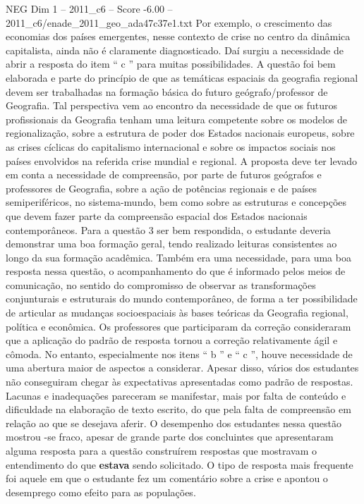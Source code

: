 \begin{textsample}{NEG Dim 1 – 2011\_c6 – Score -6.00 – 2011\_c6/enade\_2011\_geo\_ada47c37e1.txt}
Por exemplo, o crescimento das economias dos países emergentes, nesse contexto de crise no centro da dinâmica capitalista, ainda não é claramente diagnosticado.
Daí surgiu a necessidade de abrir a resposta do item “ c ” para muitas possibilidades.
A questão foi bem elaborada e parte do princípio de que as temáticas espaciais da geografia regional devem ser trabalhadas na formação básica do futuro geógrafo/professor de Geografia.
Tal perspectiva vem ao encontro da necessidade de que os futuros profissionais da Geografia tenham uma leitura competente sobre os modelos de regionalização, sobre a estrutura de poder dos Estados nacionais europeus, sobre as crises cíclicas do capitalismo internacional e sobre os impactos sociais nos países envolvidos na referida crise mundial e regional.
A proposta deve ter levado em conta a necessidade de compreensão, por parte de futuros geógrafos e professores de Geografia, sobre a ação de potências regionais e de países semiperiféricos, no sistema-mundo, bem como sobre as estruturas e concepções que devem fazer parte da compreensão espacial dos Estados nacionais contemporâneos.
Para a questão 3 ser bem respondida, o estudante deveria demonstrar uma boa formação geral, tendo realizado leituras consistentes ao longo da sua formação acadêmica.
Também era uma necessidade, para uma boa resposta nessa questão, o acompanhamento do que é informado pelos meios de comunicação, no sentido do compromisso de observar as transformações conjunturais e estruturais do mundo contemporâneo, de forma a ter possibilidade de articular as mudanças socioespaciais às bases teóricas da Geografia regional, política e econômica.
Os professores que participaram da correção consideraram que a aplicação do padrão de resposta tornou a correção relativamente ágil e cômoda.
No entanto, especialmente nos itens “ b ” e “ c ”, houve necessidade de uma abertura maior de aspectos a considerar.
Apesar disso, vários dos estudantes não conseguiram chegar às expectativas apresentadas como padrão de respostas.
Lacunas e inadequações pareceram se manifestar, mais por falta de conteúdo e dificuldade na elaboração de texto escrito, do que pela falta de compreensão em relação ao que se desejava aferir.
O desempenho dos estudantes nessa questão mostrou -se fraco, apesar de grande parte dos concluintes que apresentaram alguma resposta para a questão construírem respostas que mostravam o entendimento do que \textbf{estava} sendo solicitado.
O tipo de resposta mais frequente foi aquele em que o estudante fez um comentário sobre a crise e apontou o desemprego como efeito para as populações.

\end{textsample}
